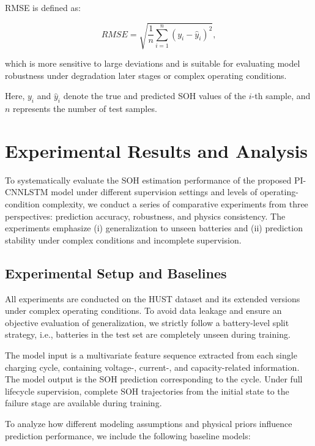 \documentclass[a4paper,fleqn]{cas-dc}
\begin{document}
RMSE is defined as:

\begin{equation}
RMSE =
\sqrt{
\frac{1}{n}
\sum_{i=1}^{n}
\left( y_i - \hat{y}_i \right)^2
},
\end{equation}

which is more sensitive to large deviations and is suitable for evaluating model robustness under degradation later stages or complex operating conditions.

Here, $y_i$ and $\hat{y}_i$ denote the true and predicted SOH values of the $i$-th sample, and $n$ represents the number of test samples.

\section{Experimental Results and Analysis}
\label{sec:experiments}

To systematically evaluate the SOH estimation performance of the proposed PI-CNNLSTM model under different supervision settings and levels of operating-condition complexity, we conduct a series of comparative experiments from three perspectives: prediction accuracy, robustness, and physics consistency. The experiments emphasize (i) generalization to unseen batteries and (ii) prediction stability under complex conditions and incomplete supervision.

\subsection{Experimental Setup and Baselines}
\label{subsec:setup}

All experiments are conducted on the HUST dataset and its extended versions under complex operating conditions. To avoid data leakage and ensure an objective evaluation of generalization, we strictly follow a battery-level split strategy, i.e., batteries in the test set are completely unseen during training.

The model input is a multivariate feature sequence extracted from each single charging cycle, containing voltage-, current-, and capacity-related information. The model output is the SOH prediction corresponding to the cycle. Under full lifecycle supervision, complete SOH trajectories from the initial state to the failure stage are available during training.

To analyze how different modeling assumptions and physical priors influence prediction performance, we include the following baseline models:
\end{document}
